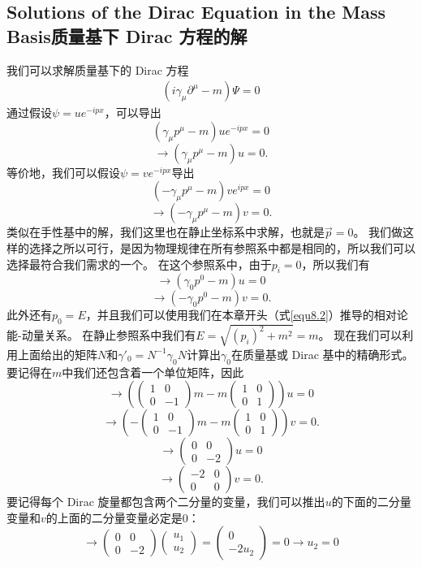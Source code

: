 \subsection[质量基下 Dirac 方程的解]{Solutions of the Dirac Equation in the Mass Basis\quad 质量基下 Dirac 方程的解}\label{sec8.10.1}

我们可以求解质量基下的 Dirac 方程
\begin{align}
  (i\gamma_\mu\partial^\mu-m)\Psi=0
\end{align}
通过假设$\psi=ue^{-ipx}$，可以导出
\[(\gamma_\mu p^\mu-m)ue^{-ipx}=0\]
\[\rightarrow(\gamma_\mu p^\mu-m)u=0.\]
等价地，我们可以假设$\psi=ve^{-ipx}$导出
\[(-\gamma_\mu p^\mu-m)ve^{ipx}=0\]
\[\rightarrow(-\gamma_\mu p^\mu-m)v=0.\]
类似在手性基中的解，我们这里也在静止坐标系中求解，也就是$\vec{p}=0$。
我们做这样的选择之所以可行，是因为物理规律在所有参照系中都是相同的，所以我们可以选择最符合我们需求的一个。
在这个参照系中，由于$p_i=0$，所以我们有
\[\rightarrow(\gamma_0p^0-m)u=0\]
\[\rightarrow(-\gamma_0p^0-m)v=0.\]
此外还有$p_0=E$，并且我们可以使用我们在本章开头（式\eqref{equ8.2}）推导的相对论能-动量关系。
在静止参照系中我们有$E=\sqrt{(p_i)^2+m^2}=m$。
现在我们可以利用上面给出的矩阵$N$和$\gamma'_0=N^{-1}\gamma_0N$计算出$\gamma_0$在质量基或 Dirac 基中的精确形式。
要记得在$m$中我们还包含着一个单位矩阵，因此
\[\rightarrow\left(\begin{pmatrix}1&0\\0&-1\end{pmatrix}m-m\begin{pmatrix}1&0\\0&1\end{pmatrix}\right)u=0\]
\[\rightarrow\left(-\begin{pmatrix}1&0\\0&-1\end{pmatrix}m-m\begin{pmatrix}1&0\\0&1\end{pmatrix}\right)v=0.\]
\[\rightarrow\begin{pmatrix}0&0\\0&-2\end{pmatrix}u=0\]
\[\rightarrow\begin{pmatrix}-2&0\\0&0\end{pmatrix}v=0.\]
要记得每个 Dirac 旋量都包含两个二分量的变量，我们可以推出$u$的下面的二分量变量和$v$的上面的二分量变量必定是0：
\[\rightarrow\begin{pmatrix}0&0\\0&-2\end{pmatrix}\begin{pmatrix}u_1\\u_2\end{pmatrix}=\begin{pmatrix}0\\-2u_2\end{pmatrix}=0\rightarrow u_2=0\]
